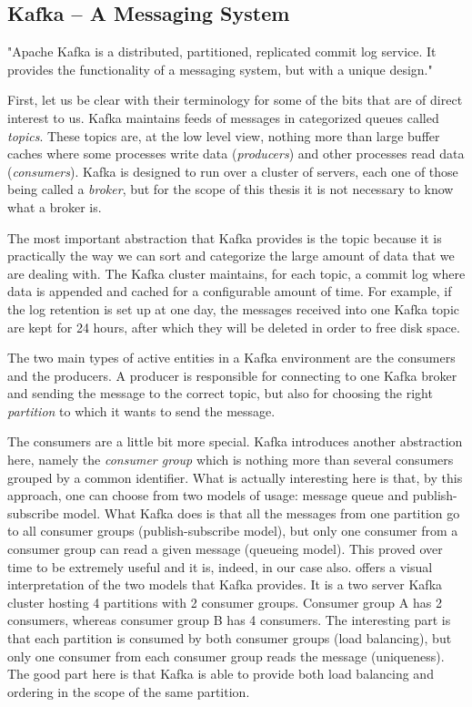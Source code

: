 \subsection{Kafka -- A Messaging System}
\label{sub-sec:kafka}

"Apache Kafka is a distributed, partitioned, replicated commit log service. It
provides the functionality of a messaging system, but with a unique
design."\cite{kafka}

First, let us be clear with their terminology for some of the bits that are of
direct interest to us. Kafka maintains feeds of messages in categorized queues
called \textit{topics}. These topics are, at the low level view, nothing more
than large buffer caches where some processes write data (\textit{producers})
and other processes read data (\textit{consumers}). Kafka is designed to run
over a cluster of servers, each one of those being called a \textit{broker}, but
for the scope of this thesis it is not necessary to know what a broker is.

The most important abstraction that Kafka provides is the topic because it is
practically the way we can sort and categorize the large amount of data that
we are dealing with. The Kafka cluster maintains, for each topic, a commit log
where data is appended and cached for a configurable amount of time. For
example, if the log retention is set up at one day, the messages received into
one Kafka topic are kept for 24 hours, after which they will be deleted in
order to free disk space.

The two main types of active entities in a Kafka environment are the consumers
and the producers. A producer is responsible for connecting to one Kafka
broker and sending the message to the correct topic, but also for choosing the
right \textit{partition} to which it wants to send the message.

The consumers are a little bit more special. Kafka introduces another abstraction
here, namely the \textit{consumer group} which is nothing more than several
consumers grouped by a common identifier. What is actually
interesting here is that, by this approach, one can choose from two models of
usage: message queue and publish-subscribe model. What Kafka does is that all
the messages from one partition go to all consumer groups (publish-subscribe
model), but only one consumer from a consumer group can read a given message
(queueing model). This proved over time to be extremely useful and it is,
indeed, in our case also.  offers a
visual interpretation of the two models that Kafka provides. It is a two
server Kafka cluster hosting 4 partitions with 2 consumer groups. Consumer
group A has 2 consumers, whereas consumer group B has 4 consumers. The
interesting part is that each partition is consumed by both consumer groups
(load balancing), but only one consumer from each consumer group reads the
message (uniqueness). The good part here is that Kafka is able to provide both
load balancing and ordering in the scope of the same partition.

